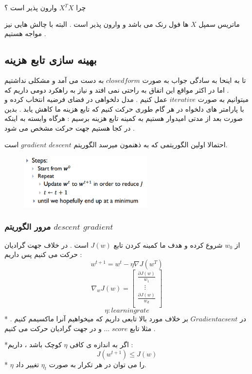 \documentclass[12pt]{article}
\begin{document}
چرا 
$X^TX $
وارون پذیر است ؟

ماتریس سمپل $X$ ها فول رنک می باشد و وارون پذیر است .
البته با چالش هایی نیز مواجه هستیم .

\subsection*{بهینه سازی تابع هزینه}
تا به اینحا به سادگی جواب  به صورت 
$closed form$
به دست می آمد و مشکلی نداشتیم . اما در اکثر مواقع این اتفاق به راحتی نمی افتد و نیاز به 
 راهکرد دومی داریم که میتوانیم 
 به صورت 
$iterative$
عمل کنیم .
مدل دلخواهی در فضای فرضیه انتخاب کرده و با پارامتر های دلخواه در هر گام طوری حرکت کنیم که تابع هزینه ما کاهش یابد . بدین صورت بعد از مدتی امیدوار هستیم به کمینه تابع هزینه برسیم :
هرگاه وابسته به اینکه در کجا هستیم جهت حرکت مشخص می شود .


احتمالا اولین الگوریتمی که به ذهنمون میرسد الگوریتم $descent$ $gradient$ است.
\begin{figure}[htbp]
  \centering
  \includegraphics[width=0.6\textwidth]{etc/Images/Fig7.png} 
  \label{fig7}
\end{figure}

\subsubsection*{مرور الگوریتم $descent$ $gradient$ }
از 
$w_0$
شروع کرده و هدف ما کمینه کردن تابع 
 $J(w)$
 است .
در خلاف جهت گرادیان حرکت می کنیم پس داریم : 
 $$
w^{t+1} = w^t - \eta \nabla J (w^T)
$$
$$\nabla_wJ(w) = \left[\begin{array}{l}
\frac{\partial J(w)}{w_1} \\
\quad \vdots \\
 \frac{\partial J(w)}{w_d}\\
\end{array}\right] $$
$$\eta : learning rate  $$
* در $Gradient acsent $ بر خلاف مورد بالا تابعی داریم که میخواهیم آنرا ماکسیمم کنیم . مثلا  تابع $score$ ... و در جهت گرادیان حرکت می کنیم .

*اگر به اندازه ی کافی 
$\eta$
کوچک باشد ، داریم :
$$J(w^{t+1}) \leq J(w) $$
* $\eta$ 
را می توان
در هر تکرار 
به صورت
$\eta_t$ تغییر
داد.
\end{document}
